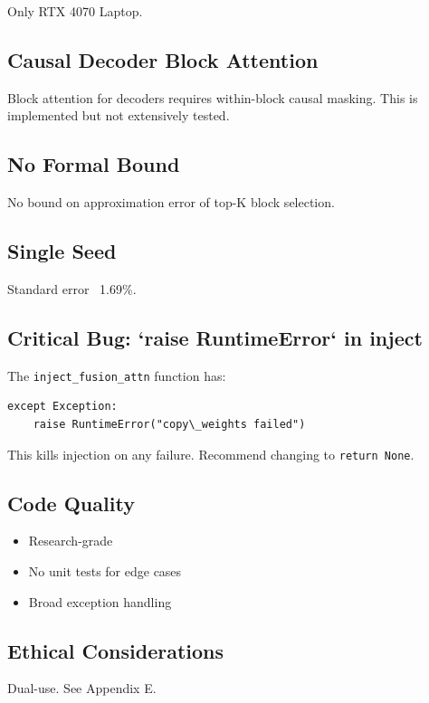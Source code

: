 Only RTX 4070 Laptop.

\subsection{Causal Decoder Block Attention}

Block attention for decoders requires within-block causal masking. This is 
implemented but not extensively tested.

\subsection{No Formal Bound}

No bound on approximation error of top-K block selection.

\subsection{Single Seed}

Standard error ~1.69\%.

\subsection{Critical Bug: `raise RuntimeError` in inject}

The \texttt{inject\_fusion\_attn} function has:

\begin{lstlisting}
except Exception:
    raise RuntimeError("copy\_weights failed")
\end{lstlisting}

This kills injection on any failure. Recommend changing to \texttt{return None}.

\subsection{Code Quality}

\begin{itemize}
\item Research-grade
\item No unit tests for edge cases
\item Broad exception handling

\end{itemize}
\subsection{Ethical Considerations}

Dual-use. See Appendix E.

